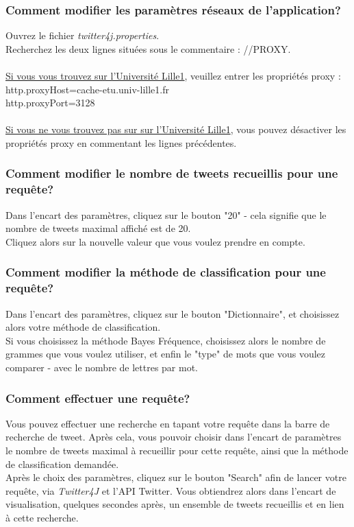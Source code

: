 \documentclass[pdftex,12pt,a4paper]{report}
\begin{document}
\begin{spacing}{1.2}
\subsubsection{Comment modifier les paramètres réseaux de l'application?}

Ouvrez le fichier \textit{twitter4j.properties}.
\\
Recherchez les deux lignes situées sous le commentaire : //PROXY.
\\
\\
\underline{Si vous vous trouvez sur l'Université Lille1}, veuillez entrer les propriétés proxy : 
\\	http.proxyHost=cache-etu.univ-lille1.fr
\\	http.proxyPort=3128
\\
\\
\underline{Si vous ne vous trouvez pas sur sur l'Université Lille1}, vous pouvez désactiver les propriétés proxy en commentant les lignes précédentes.

\subsubsection{Comment modifier le nombre de tweets recueillis pour une requête?}

Dans l'encart des paramètres, cliquez sur le bouton "20" - cela signifie que le nombre de tweets maximal affiché est de 20.
\\
Cliquez alors sur la nouvelle valeur que vous voulez prendre en compte.

\subsubsection{Comment modifier la méthode de classification pour une requête?}

Dans l'encart des paramètres, cliquez sur le bouton "Dictionnaire", et choisissez alors votre méthode de classification.
\\
Si vous choisissez la méthode Bayes Fréquence, choisissez alors le nombre de grammes que vous voulez utiliser, et enfin le "type" de mots que vous voulez comparer - avec le nombre de lettres par mot.

\subsubsection{Comment effectuer une requête?}

Vous pouvez effectuer une recherche en tapant votre requête dans la barre de recherche de tweet. Après cela, vous pouvoir choisir dans l'encart de paramètres le nombre de tweets maximal à recueillir pour cette requête, ainsi que la méthode de classification demandée.
\\
Après le choix des paramètres, cliquez sur le bouton "Search" afin de lancer votre requête, via \textit{Twitter4J} et l'API Twitter. Vous obtiendrez alors dans l'encart de visualisation, quelques secondes après, un ensemble de tweets recueillis et en lien à cette recherche.


\end{spacing}
\end{document}

